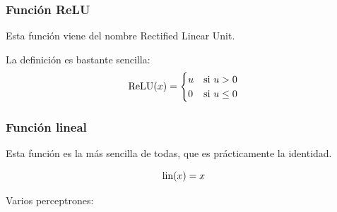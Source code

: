 
\subsubsection*{Función ReLU}

Esta función viene del nombre Rectified Linear Unit.

La definición es bastante sencilla:
\begin{equation}
    \operatorname{ReLU}(x) = 
    \begin{cases}
        u & \mbox{si } u>0\\
        0 & \mbox{si } u\leq0\\
    \end{cases}
\end{equation}

\subsubsection*{Función lineal}

Esta función es la más sencilla de todas, que es prácticamente la identidad.

\begin{equation}
    \operatorname{lin}(x) = x
\end{equation}

Varios perceptrones:


